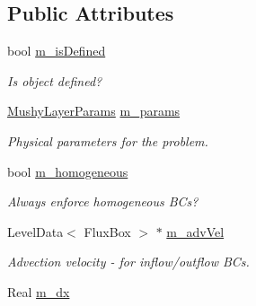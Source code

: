 \subsection*{Public Attributes}
\begin{DoxyCompactItemize}
\item 
\hypertarget{class_abstract_scalar_b_c_function_ad13bee09bd7086a370e6f189d5641a29}{bool \hyperlink{class_abstract_scalar_b_c_function_ad13bee09bd7086a370e6f189d5641a29}{m\-\_\-is\-Defined}}\label{class_abstract_scalar_b_c_function_ad13bee09bd7086a370e6f189d5641a29}

\begin{DoxyCompactList}\small\item\em Is object defined? \end{DoxyCompactList}\item 
\hypertarget{class_abstract_scalar_b_c_function_a842c21b2fc8524d9f9c0b35ecb89e79b}{\hyperlink{class_mushy_layer_params}{Mushy\-Layer\-Params} \hyperlink{class_abstract_scalar_b_c_function_a842c21b2fc8524d9f9c0b35ecb89e79b}{m\-\_\-params}}\label{class_abstract_scalar_b_c_function_a842c21b2fc8524d9f9c0b35ecb89e79b}

\begin{DoxyCompactList}\small\item\em Physical parameters for the problem. \end{DoxyCompactList}\item 
\hypertarget{class_abstract_scalar_b_c_function_af24438d991ddc85df1f20f24a4a27ce8}{bool \hyperlink{class_abstract_scalar_b_c_function_af24438d991ddc85df1f20f24a4a27ce8}{m\-\_\-homogeneous}}\label{class_abstract_scalar_b_c_function_af24438d991ddc85df1f20f24a4a27ce8}

\begin{DoxyCompactList}\small\item\em Always enforce homogeneous B\-Cs? \end{DoxyCompactList}\item 
\hypertarget{class_abstract_scalar_b_c_function_a0c30e160f68816f2f87393397d76c4c6}{Level\-Data$<$ Flux\-Box $>$ $\ast$ \hyperlink{class_abstract_scalar_b_c_function_a0c30e160f68816f2f87393397d76c4c6}{m\-\_\-adv\-Vel}}\label{class_abstract_scalar_b_c_function_a0c30e160f68816f2f87393397d76c4c6}

\begin{DoxyCompactList}\small\item\em Advection velocity -\/ for inflow/outflow B\-Cs. \end{DoxyCompactList}\item 
\hypertarget{class_abstract_scalar_b_c_function_a32f08977d322c7c498a7567ed309d096}{Real \hyperlink{class_abstract_scalar_b_c_function_a32f08977d322c7c498a7567ed309d096}{m\-\_\-dx}}\label{class_abstract_scalar_b_c_function_a32f08977d322c7c498a7567ed309d096}


\end{DoxyCompactItemize}
